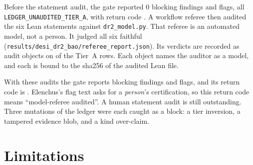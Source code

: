 \documentclass[11pt]{article}
\begin{document}
Before the statement audit, the gate reported 0 blocking findings and
\LedgerPreFlag{} flags, all \texttt{LEDGER\_UNAUDITED\_TIER\_A}, with
return code \LedgerPreRc. A workflow referee then audited the six Lean
statements against \texttt{dr2\_model.py}. That referee is an automated
model, not a person. It judged all six faithful
(\texttt{results/desi\_dr2\_bao/referee\_report.json}). Its verdicts are
recorded as audit objects on \LedgerAudited{} of the \LedgerTierA{} Tier~A
rows. Each object names the auditor as a model, and each is bound to the
sha256 of the audited Lean file.

With these audits the gate reports \LedgerBlock{} blocking findings and
\LedgerFlag{} flags, and its return code is \LedgerRc. Elenchus's flag text
asks for a \emph{person}'s certification, so this return code means
``model-referee audited''. A human statement audit is still outstanding.
Three mutations of the ledger were each caught as a block: a tier
inversion, a tampered evidence blob, and a kind over-claim.

\section{Limitations}
\end{document}
